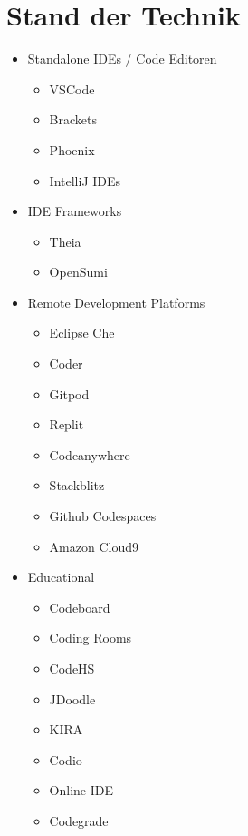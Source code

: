 \chapter{Stand der Technik} \label{stand_der_technik}

\begin{itemize}
    \item Standalone IDEs / Code Editoren
          \begin{itemize}
              \item VSCode
              \item Brackets
              \item Phoenix
              \item IntelliJ IDEs
          \end{itemize}
    \item IDE Frameworks
          \begin{itemize}
              \item Theia
              \item OpenSumi
          \end{itemize}
    \item Remote Development Platforms
          \begin{itemize}
              \item Eclipse Che
              \item Coder
              \item Gitpod
              \item Replit
              \item Codeanywhere
              \item Stackblitz
              \item Github Codespaces
              \item Amazon Cloud9
          \end{itemize}
    \item Educational
          \begin{itemize}
              \item Codeboard
              \item Coding Rooms
              \item CodeHS
              \item JDoodle
              \item KIRA
              \item Codio
              \item Online IDE
              \item Codegrade
          \end{itemize}
\end{itemize}

